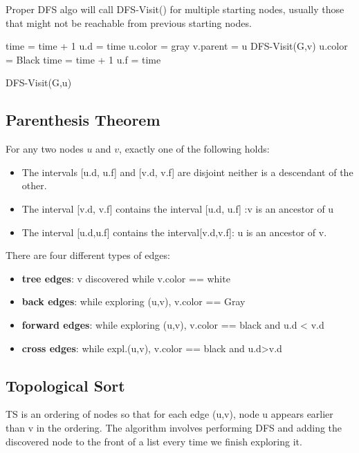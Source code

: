 \documentclass{article}
\begin{document}
\begin{multicols*}{5}
							Proper DFS algo will call DFS-Visit() for multiple starting nodes, usually those that
							might not be reachable from previous starting nodes. 
							\begin{algorithm}[H]
								\SetAlgoLined
								time = time + 1\;
								u.d = time\;
								u.color = gray\;
									{
											{
												v.parent = u\;			
												DFS-Visit(G,v)\;
											}			
									}
									u.color = Black\;
									time = time + 1\;
									u.f = time\;
								\caption{DFS-Visit(G,u)}
							\end{algorithm}
			\subsection{Parenthesis Theorem}					
					For any two nodes $u$ and $v$, exactly one of the following holds: 
					\begin{itemize}
							\item{The intervals [u.d, u.f] and [v.d, v.f] are disjoint}
								neither is a descendant of the other. 
							\item{The interval [v.d, v.f] contains the interval [u.d, u.f]}
									:v is an ancestor of u
							\item{The interval [u.d,u.f] contains the interval[v.d,v.f]}: 	
									u is an ancestor of v. 
					\end{itemize}
					There are four different types of edges:
					\begin{itemize}
							\item{\textbf{tree edges}}: v discovered while v.color == white
							\item{\textbf{back edges}}: while exploring (u,v), v.color == Gray
							\item{\textbf{forward edges}}: while exploring (u,v), v.color == black and
									u.d < v.d 
							\item{\textbf{cross edges}}: while expl.(u,v), v.color == black and u.d>v.d
					\end{itemize}
			\subsection{Topological Sort}
				TS is an ordering of nodes so that for each edge (u,v), node u appears earlier than v in the 
				ordering. The algorithm involves performing DFS and adding the discovered node to the front
				of a list every time we finish exploring it. 
\end{multicols*}
\end{document}
